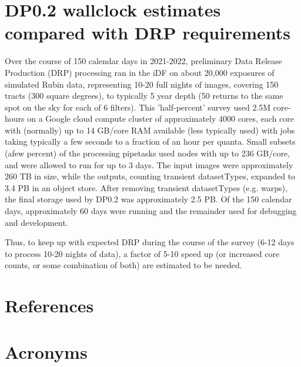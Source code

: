 \documentclass[OPS,authoryear,toc]{lsstdoc}
\begin{document}
\section{DP0.2 wallclock estimates compared with DRP requirements}

Over the course of 150 calendar days in 2021-2022, preliminary Data
Release Production (DRP) processing ran in the iDF on about 20,000
exposures of simulated Rubin data, representing 10-20 full nights of
images, covering 150 tracts (300 square degrees), to typically 5 year
depth (50 returns to the same spot on the sky for each of 6 filters).
This 'half-percent' survey used 2.5M core-hours on a Google cloud compute 
cluster of approximately 4000 cores, each core with (normally) up 
to 14 GB/core RAM available (less typically used) with jobs 
taking typically a few seconds to a fraction of an hour per quanta.  
Small subsets (afew percent) of the processing pipetasks used nodes 
with up to 236 GB/core, and were allowed to run for up to 3 days.  
The input images were approximately 260 TB in size, while the outputs, 
counting transient datasetTypes, expanded to 3.4 PB in an object store.  
After removing transient datasetTypes (e.g. warps), the final storage 
used by DP0.2 was approximately 2.5 PB.  Of the 150 calendar days, 
approximately 60 days were running and the remainder used for 
debugging and development.

Thus, to keep up with expected DRP during the course of the survey
(6-12 days to process 10-20 nights of data), a factor of 5-10 speed up
(or increased core counts, or some combination of both) are estimated
to be needed.   


\appendix
\section{References} \label{sec:bib}
\renewcommand{\refname}{} %


\section{Acronyms} \label{sec:acronyms}

\end{document}
